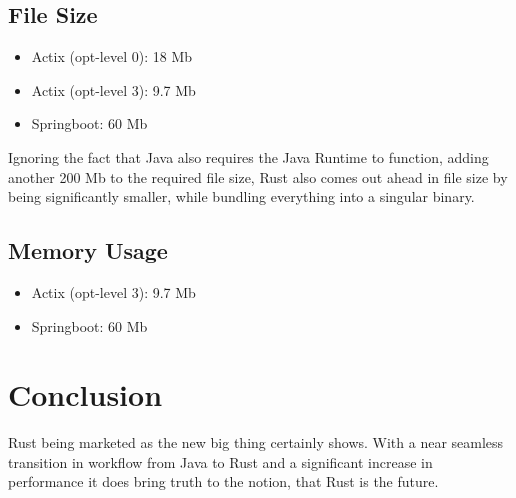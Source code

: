 \documentclass[a4paper,12pt]{article}
\begin{document}
	\subsection*{File Size}
	\begin{itemize}
		\item Actix (opt-level 0): 18 Mb
		\item Actix (opt-level 3): 9.7 Mb
		\item Springboot: 60 Mb
	\end{itemize}
	Ignoring the fact that Java also requires the Java Runtime to function, adding another 200 Mb to the required file size, Rust also
	comes out ahead in file size by being significantly smaller, while bundling everything into a singular binary.
	\subsection*{Memory Usage}
	\begin{itemize}
		\item Actix (opt-level 3): 9.7 Mb
		\item Springboot: 60 Mb
	\end{itemize}
	\newpage
	\clearpage

	\section{Conclusion}
	\label{subsec:conclusion}
	Rust being marketed as the new big thing certainly shows. With a near seamless transition in workflow from Java to Rust and a
	significant increase in performance it does bring truth to the notion, that Rust is the future.
\end{document}
